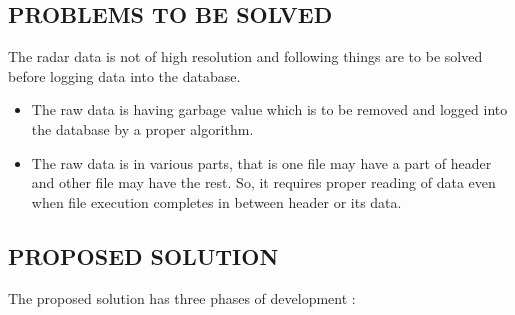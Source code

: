 \documentclass[14pt]{article} %
\begin{document}
\subsection{PROBLEMS TO BE SOLVED}
\noindent  The radar data is not of high resolution and following things are to be solved before logging data into the database.
\begin{itemize}
\item The raw data is having garbage value which is to be removed and logged into the database by a proper algorithm.
\item The  raw data is in various parts, that is one file may have a part of header and other file may have the rest. So, it  requires proper reading of data even when file execution completes in between header or its data.
 \end{itemize}

\subsection{PROPOSED SOLUTION }
\noindent The proposed solution has three phases of development :
\end{document}
